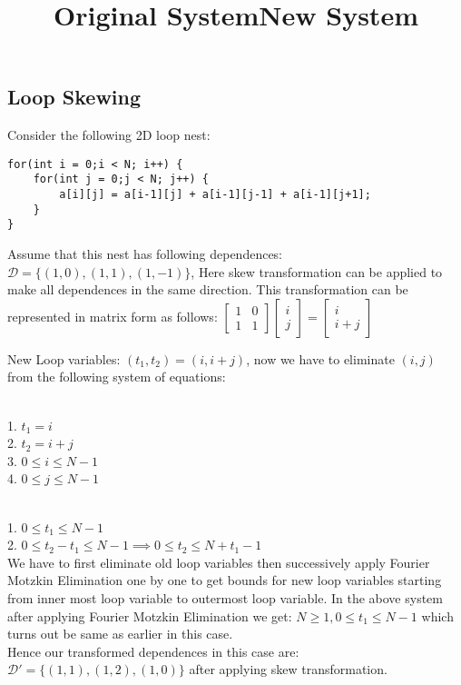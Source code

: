 \documentclass{article}
\begin{document}
\subsection*{Loop Skewing}
Consider the following 2D loop nest:
\begin{lstlisting}
for(int i = 0;i < N; i++) {
    for(int j = 0;j < N; j++) {
        a[i][j] = a[i-1][j] + a[i-1][j-1] + a[i-1][j+1];
    }
}
\end{lstlisting}
Assume that this nest has following dependences: $\mathcal{D} = \{(1,0),(1,1),(1,-1)\}$, Here skew transformation can be applied to make all dependences in the same direction. This transformation can be represented in matrix form as follows:
$\begin{bmatrix}
    1 & 0 \\
    1 & 1 
\end{bmatrix} \begin{bmatrix}
    i \\ j
\end{bmatrix} = \begin{bmatrix}
    i \\ i+j
\end{bmatrix}$

New Loop variables: $(t_1,t_2) = (i,i+j)$, now we have to eliminate $(i,j)$ from the following system of equations: 
\title{Original System} \\
1. $t_1 = i$ \\
2. $t_2 = i+j$ \\
3. $0 \leq i \leq N-1$ \\
4. $0 \leq j \leq N-1$ \\

\title{New System} \\
1. $0 \leq t_1 \leq N-1$ \\
2. $0 \leq t_2-t_1 \leq N-1 \implies 0 \leq t_2 \leq N+t_1-1$ \\

We have to first eliminate old loop variables then successively apply Fourier Motzkin Elimination one by one to get bounds for new loop variables starting from inner most loop variable to outermost loop variable. In the above system after applying Fourier Motzkin Elimination we get: $N \geq 1, 0 \leq  t_1 \leq N-1$ which turns out be same as earlier in this case. \\

Hence our transformed dependences in this case are: $\mathcal{D}' = \{(1,1),(1,2),(1,0)\}$ after applying skew transformation. \\
\end{document}
